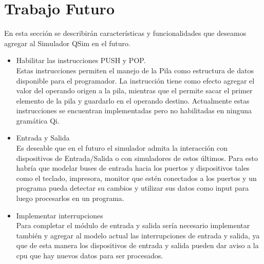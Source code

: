 \section{Trabajo Futuro}

En esta sección se describirán características y funcionalidades que deseamos agregar al Simulador QSim en el futuro.

\begin{itemize}

\item Habilitar las instrucciones PUSH y POP.\\

Estas instrucciones permiten el manejo de la Pila como estructura de datos disponible para el programador. La instrucción  tiene como efecto agregar el valor del operando origen a la pila, mientras que el  permite sacar el primer elemento de la pila y guardarlo en el operando destino. Actualmente estas instrucciones se encuentran implementadas pero no habilitadas en ninguna gramática Qi.

\item Entrada y Salida\\

Es deseable que en el futuro el simulador admita la interacción con dispositivos de Entrada/Salida o con simuladores de estos últimos. Para esto habría que modelar buses de entrada hacia los puertos y dispositivos tales como el teclado, impresora, monitor que estén conectados a los puertos y un programa pueda detectar su cambios y utilizar sus datos como input para luego procesarlos en un programa.

\item Implementar interrupciones\\

Para completar el módulo de entrada y salida sería necesario implementar también y agregar al modelo actual las interrupciones de entrada y salida, ya que de esta manera los dispositivos de entrada y salida pueden dar aviso a la cpu que hay nuevos datos para ser procesados.

\end{itemize}
